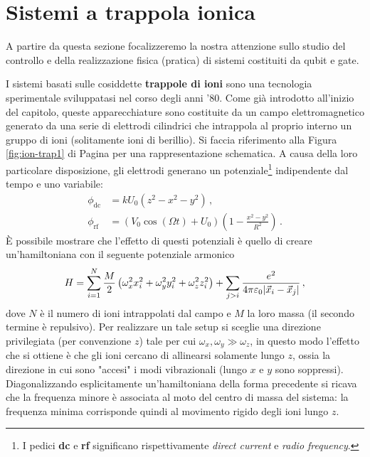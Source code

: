 \vspace{1cm}

\noindent{}

\section{Sistemi a trappola ionica}
A partire da questa sezione focalizzeremo la nostra attenzione sullo studio del controllo e della realizzazione fisica (pratica) di sistemi costituiti da qubit e gate. 

\noindent I sistemi basati sulle cosiddette \textbf{trappole di ioni} sono una tecnologia sperimentale sviluppatasi nel corso degli anni '80. Come già introdotto all'inizio del capitolo, queste apparecchiature sono costituite da un campo elettromagnetico generato da una serie di elettrodi cilindrici che intrappola al proprio interno un gruppo di ioni (solitamente ioni di berillio). Si faccia riferimento alla Figura \ref{fig:ion-trap1} di Pagina \pageref{fig:ion-trap1} per una rappresentazione schematica. A causa della loro particolare disposizione, gli elettrodi generano un potenziale\footnote{I pedici \textbf{dc} e \textbf{rf} significano rispettivamente \textit{direct current} e \textit{radio frequency}.} indipendente dal tempo e uno variabile:
\begin{align*}
    \phi_{\text{dc}} &= k U_0 \left( z^2 - x^2 - y^2 \right) \, , \\
    \phi_{\text{rf}} &= \left( V_0 \cos(\Omega t) + U_0 \right) \left( 1-\frac{x^2-y^2}{R^2} \right) \, .
\end{align*}
È possibile mostrare che l'effetto di questi potenziali è quello di creare un'hamiltoniana con il seguente potenziale armonico
\begin{equation*}
    H = \sum_{i=1}^N \frac{M}{2} \left( \omega_x^2 x_i^2 + \omega_y^2 y_i^2 + \omega_z^2 z_i^2 \right) + \sum_{j>i} \frac{e^2}{4 \pi \varepsilon_0 \abs{\vec{x}_i - \vec{x}_j}} \, ,
\end{equation*}
dove $N$ è il numero di ioni intrappolati dal campo e $M$ la loro massa (il secondo termine è repulsivo). Per realizzare un tale setup si sceglie una direzione privilegiata (per convenzione $z$) tale per cui $\omega_x, \omega_y \gg \omega_z$, in questo modo l'effetto che si ottiene è che gli ioni cercano di allinearsi solamente lungo $z$, ossia la direzione in cui sono "accesi" i modi vibrazionali (lungo $x$ e $y$ sono soppressi). Diagonalizzando esplicitamente un'hamiltoniana della forma precedente si ricava che la frequenza minore è associata al moto del centro di massa del sistema: la frequenza minima corrisponde quindi al movimento rigido degli ioni lungo $z$. 

